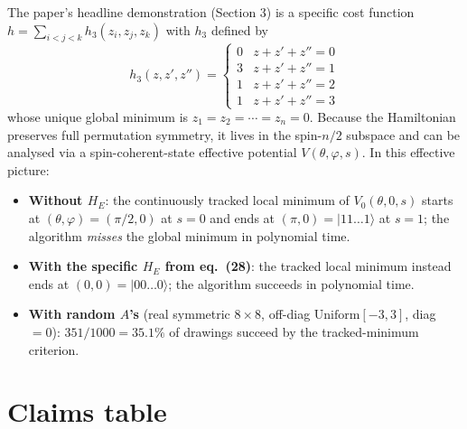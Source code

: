 \documentclass[11pt]{article}
\begin{document}
The paper's headline demonstration (Section 3) is a specific cost function
$h = \sum_{i<j<k} h_3(z_i, z_j, z_k)$ with $h_3$ defined by
\begin{equation}
h_3(z,z',z'') = \begin{cases} 0 & z+z'+z''=0 \\ 3 & z+z'+z''=1 \\ 1 & z+z'+z''=2 \\ 1 & z+z'+z''=3 \end{cases}
\tag{13 in paper}
\end{equation}
whose unique global minimum is $z_1 = z_2 = \cdots = z_n = 0$. Because the
Hamiltonian preserves full permutation symmetry, it lives in the spin-$n/2$
subspace and can be analysed via a spin-coherent-state effective potential
$V(\theta, \varphi, s)$. In this effective picture:

\begin{itemize}
    \item \textbf{Without $H_E$}: the continuously tracked local minimum of
      $V_0(\theta, 0, s)$ starts at $(\theta, \varphi) = (\pi/2, 0)$ at $s=0$
      and ends at $(\pi, 0) = |11\dots1\rangle$ at $s=1$; the algorithm
      \emph{misses} the global minimum in polynomial time.
    \item \textbf{With the specific $H_E$ from eq.\ (28)}: the tracked local
      minimum instead ends at $(0, 0) = |00\dots0\rangle$; the algorithm
      succeeds in polynomial time.
    \item \textbf{With random $A$'s} (real symmetric $8 \times 8$, off-diag
      $\mathrm{Uniform}[-3,3]$, diag $=0$): $351/1000 = 35.1\%$ of drawings
      succeed by the tracked-minimum criterion.
\end{itemize}

\section{Claims table}
\end{document}
